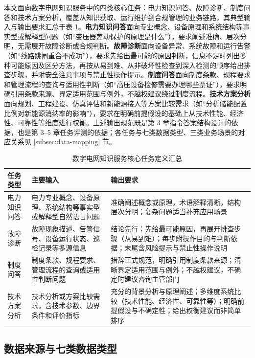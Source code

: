 \documentclass[fontset=fandol,type=master,campus=shenzhen,etitleauto=true]{hithesisbook}
\begin{document}
本文面向数字电网知识服务中的四类核心任务：电力知识问答、故障诊断、制度问答和技术方案分析，覆盖从知识获取、运行维护到合规管理的业务链路，其典型输入与输出要求汇总于表 \ref{tab:task-def}。\textbf{电力知识问答}面向专业概念、设备原理和系统结构等事实型或解释型问题（如``变压器差动保护的原理是什么''），要求阐述准确、层次分明，无需展开故障诊断或合规判断。\textbf{故障诊断}面向设备异常、系统故障和运行告警（如``线路跳闸重合不成功''），要求先给出最可能的原因判断，信息不足时列出多种可能原因及区分方法，再按从易到难、从非破坏性检查到深入检测的顺序给出排查步骤，并附安全注意事项与禁止性操作提示。\textbf{制度问答}面向制度条款、规程要求和管理流程的查询与适用性判断（如``高压设备检修需要办理哪些票证''），要求明确引用条款来源、界定适用范围与例外，不越权建议绕过制度流程。\textbf{技术方案分析}面向规划、工程建设、仿真评估和新能源接入等方案比较需求（如``分析储能配置比例对新能源消纳率的影响''），要求在明确前提假设的基础上从技术性能、经济性、可靠性等维度进行权衡。上述输出规范既是第 3 章指令答案结构设计的依据，也是第 3--5 章任务评测的依据；各任务与七类数据类型、三类业务场景的对应关系见 \ref{subsec:data-mapping} 节。

\begin{table}[htbp]
\centering
\caption{数字电网知识服务核心任务定义汇总}
\label{tab:task-def}
\small
\begin{tabular}{p{2.5cm}p{4.5cm}p{6.0cm}}
\toprule
\textbf{任务类型} & \textbf{主要输入} & \textbf{输出要求} \\
\midrule
电力知识问答 & 电力专业概念、设备原理、系统结构等事实型或解释型自然语言问题 & 准确阐述概念或原理，术语解释清晰，结构层次分明；复杂问题适当补充应用场景 \\
\addlinespace
故障诊断 & 故障现象描述、告警信号、设备运行状态、巡检记录等多源信息 & 结论先行：先给最可能原因，再展开排查步骤（从易到难）；每步附操作目的与判断依据；末尾含风险提示与禁止性操作说明 \\
\addlinespace
制度问答 & 制度条款、规程要求、管理流程的查询或适用性判断问题 & 措辞正式规范，明确引用制度条款来源；清晰界定适用范围与例外；不越权建议，不确定时建议咨询主管部门 \\
\addlinespace
技术方案分析 & 技术分析或方案比较需求，含技术参数、边界条件和评价指标 & 充分的背景分析与原理阐述；多维度系统比较（技术性能、经济性、可靠性等）；明确前提假设与不确定性；给出权衡建议而非简单排序 \\
\bottomrule
\end{tabular}
\end{table}

\subsection{数据来源与七类数据类型}\label{ux6570ux636eux6765ux6e90ux4e0eux4e03ux7c7bux6570ux636eux7c7bux578b}
\end{document}
